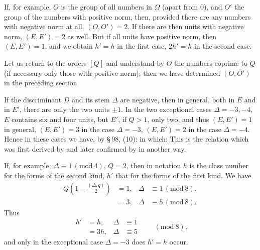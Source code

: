 
If, for example, $O$ is the group of all numbers in $\Omega$ (apart from 0), and $O'$ the group of the numbers with positive norm, then, provided there are any numbers with negative norm at all, $(O, O') = 2$. If there are then units with negative norm, $(E, E') = 2$ as well. But if all units have positive norm, then $(E, E') = 1$, and we obtain $h' = h$ in the first case, $2h' = h$ in the second case.


Let us return to the orders $[Q]$ and understand by $O$ the numbers coprime to $Q$ (if necessary only those with positive norm); then we have determined $(O, O')$ in the preceding section.

If the discriminant $D$ and its stem $\Delta$ are negative, then in general, both in $E$ and in $E'$, there are only the two units $\pm 1$. In the two exceptional cases $\Delta = -3, -4$, $E$ contains six and four units, but $E'$, if $Q > 1$, only two, and thus $(E, E') = 1$ in general, $(E, E') = 3$ in the case $\Delta = -3$, $(E, E') = 2$ in the case $\Delta = -4$. Hence in these cases we have, by \S\,98, (10):
in which:
This is the relation which was first derived by  and later confirmed by  in another way.

If, for example, $\Delta \equiv 1 \, (\mathrm{mod}\ 4)$, $Q = 2$, then in  notation $h$ is the class number for the forms of the second kind, $h'$ that for the forms of the first kind. We have
\[
\begin{aligned}
Q\left(1 - \frac{(\Delta, q)}{2}\right) &= 1, & \Delta &\equiv 1 \, (\mathrm{mod}\ 8), \\
&= 3, & \Delta &\equiv 5 \, (\mathrm{mod}\ 8).
\end{aligned}
\]
Thus
\[
\begin{aligned}
h' &= h, & \Delta &\equiv 1 \\
&= 3h, & \Delta &\equiv 5
\end{aligned}
\qquad (\mathrm{mod}\ 8),
\]
and only in the exceptional case $\Delta = -3$ does $h' = h$ occur.
